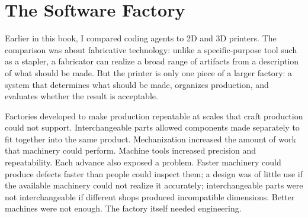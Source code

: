 


\chapter{The Software Factory}



Earlier in this book, I compared coding agents to 2D and 3D printers. The comparison was about fabricative technology: unlike a specific-purpose tool such as a stapler, a fabricator can realize a broad range of artifacts from a description of what should be made. But the printer is only one piece of a larger factory: a system that determines what should be made, organizes production, and evaluates whether the result is acceptable.


Factories developed to make production repeatable at scales that craft production could not support. Interchangeable parts allowed components made separately to fit together into the same product. Mechanization increased the amount of work that machinery could perform. Machine tools increased precision and repeatability. Each advance also exposed a problem. Faster machinery could produce defects faster than people could inspect them; a design was of little use if the available machinery could not realize it accurately; interchangeable parts were not interchangeable if different shops produced incompatible dimensions. Better machines were not enough. The factory itself needed engineering.

